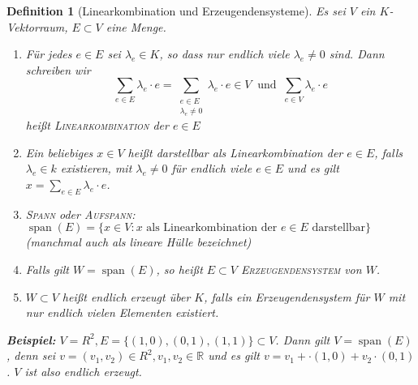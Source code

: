 \documentclass{report}
\newcommand{\lb}{\lambda}
\newcommand{\R}{\mathbb{R}}
\DeclareMathOperator{\Span}{span}
\theoremstyle{customrem}
\theoremstyle{customdef}
\newtheorem{definition}{Definition}[chapter]
\theoremstyle{customenv}
\newcommand{\defemph}[1]{\textsc{#1}}
\begin{document}
	\begin{definition}[Linearkombination und Erzeugendensysteme]
		Es sei \(V\) ein \(K\)-Vektorraum, \(E \subset V\) eine Menge.
		
		\begin{enumerate}
			\item Für jedes \(e \in E\) sei \(\lb_e \in K\), so dass nur endlich viele \(\lb_e \neq 0\) sind. Dann schreiben wir 
			\[
			\sum_{e \in E}\lb_e \cdot e = \sum_{\substack{e\in E\\\lb_e \neq 0}} \lb_e \cdot e \in V\ \text{ und }\ \sum_{e \in V} \lb_e \cdot e
			\]
			heißt \defemph{Linearkombination} der \(e \in E\)
			\item Ein beliebiges \(x \in V\) heißt darstellbar als Linearkombination der \(e \in E\), falls \(\lb_e \in k\) existieren, mit \(\lb_e \neq 0\) für endlich viele \(e \in E\) und es gilt \(x = \sum_{e \in E}\lb_e \cdot e\).
			\item \defemph{Spann} oder \defemph{Aufspann}: \(\Span(E) = \{x \in V : x \text{ als Linearkombination der } e \in E \text{ darstellbar}\}\) (manchmal auch als lineare Hülle bezeichnet)
			\item Falls gilt \(W = \Span(E)\), so heißt \(E \subset V\) \defemph{Erzeugendensystem} von \(W\).
			\item \(W \subset V\) heißt endlich erzeugt über \(K\), falls ein Erzeugendensystem für \(W\) mit nur endlich vielen Elementen existiert.
		\end{enumerate}
		\textbf{Beispiel: } 
		\(V = R^2, E = \{(1, 0), (0, 1), (1, 1)\} \subset V\). Dann gilt \(V = \Span(E)\), denn sei \(v = (v_1, v_2) \in R^2, v_1, v_2 \in \R\) und es gilt \(v = v_1 + \cdot (1, 0) + v_2 \cdot (0, 1)\). \(V\) ist also endlich erzeugt.
		
	\end{definition}
	
\end{document}
